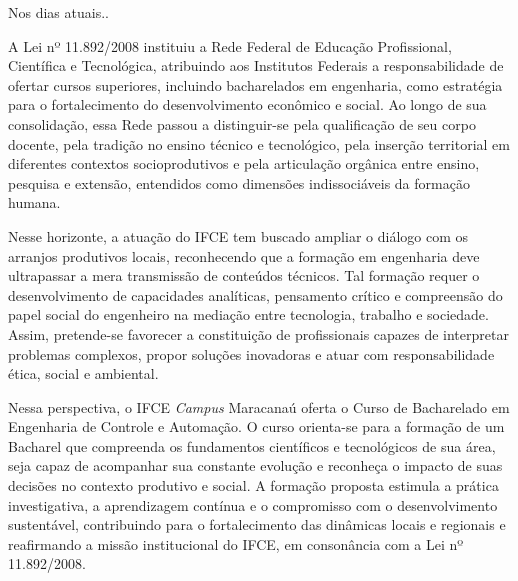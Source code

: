 {\vm Nos dias atuais..}


A Lei nº 11.892/2008 instituiu a Rede Federal de Educação Profissional, Científica e Tecnológica, atribuindo aos Institutos Federais a responsabilidade de ofertar cursos superiores, incluindo bacharelados em engenharia, como estratégia para o fortalecimento do desenvolvimento econômico e social. Ao longo de sua consolidação, essa Rede passou a distinguir-se pela qualificação de seu corpo docente, pela tradição no ensino técnico e tecnológico, pela inserção territorial em diferentes contextos socioprodutivos e pela articulação orgânica entre ensino, pesquisa e extensão, entendidos como dimensões indissociáveis da formação humana.

Nesse horizonte, a atuação do IFCE tem buscado ampliar o diálogo com os arranjos produtivos locais, reconhecendo que a formação em engenharia deve ultrapassar a mera transmissão de conteúdos técnicos. Tal formação requer o desenvolvimento de capacidades analíticas, pensamento crítico e compreensão do papel social do engenheiro na mediação entre tecnologia, trabalho e sociedade. Assim, pretende-se favorecer a constituição de profissionais capazes de interpretar problemas complexos, propor soluções inovadoras e atuar com responsabilidade ética, social e ambiental.

Nessa perspectiva, o IFCE \textit{Campus} Maracanaú oferta o Curso de Bacharelado em Engenharia de Controle e Automação. O curso orienta-se para a formação de um Bacharel que compreenda os fundamentos científicos e tecnológicos de sua área, seja capaz de acompanhar sua constante evolução e reconheça o impacto de suas decisões no contexto produtivo e social. A formação proposta estimula a prática investigativa, a aprendizagem contínua e o compromisso com o desenvolvimento sustentável, contribuindo para o fortalecimento das dinâmicas locais e regionais e reafirmando a missão institucional do IFCE, em consonância com a Lei nº 11.892/2008.



